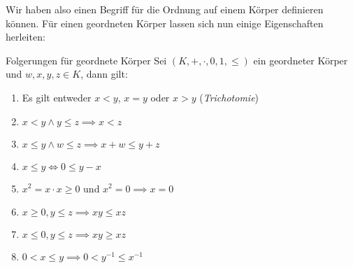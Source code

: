 Wir haben also einen Begriff für die Ordnung auf einem Körper definieren können. Für einen geordneten Körper lassen sich nun einige Eigenschaften herleiten:

\begin{satz}{Folgerungen für geordnete Körper}{}
 Sei $(K, +, \cdot,0, 1, \leq)$ ein geordneter Körper und $w,x,y,z \in K$, dann gilt:
\begin{enumerate}[label=\alph*)]
    \item Es gilt entweder $x<y$, $x=y$ oder $x>y$ \hfill (\textit{Trichotomie})
    \item $x < y \land y \leq z \implies x < z$
    \item $x \leq y \land w \leq z \implies x + w \leq y + z$ 
    \item $x \leq y \iff 0 \leq y - x$
    \item $x^2 = x\cdot x \geq 0$ und $x^2 = 0 \implies x = 0$
    \item $x \geq 0, y \leq z \implies xy \leq xz$
    \item $x \leq 0, y \leq z \implies xy \geq xz$
    \item $0<x\leq y \implies 0 < y^{-1} \leq x^{-1}$
\end{enumerate}
\end{satz}
